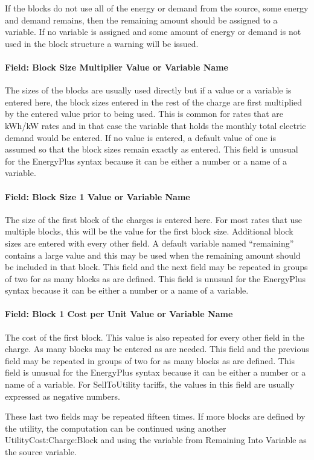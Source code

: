 If the blocks do not use all of the energy or demand from the source, some energy and demand remains, then the remaining amount should be assigned to a variable. If no variable is assigned and some amount of energy or demand is not used in the block structure a warning will be issued.

\paragraph{Field: Block Size Multiplier Value or Variable Name}\label{field-block-size-multiplier-value-or-variable-name}

The sizes of the blocks are usually used directly but if a value or a variable is entered here, the block sizes entered in the rest of the charge are first multiplied by the entered value prior to being used. This is common for rates that are kWh/kW rates and in that case the variable that holds the monthly total electric demand would be entered. If no value is entered, a default value of one is assumed so that the block sizes remain exactly as entered. This field is unusual for the EnergyPlus syntax because it can be either a number or a name of a variable.

\paragraph{Field: Block Size 1 Value or Variable Name}\label{field-block-size-1-value-or-variable-name}

The size of the first block of the charges is entered here. For most rates that use multiple blocks, this will be the value for the first block size. Additional block sizes are entered with every other field. A default variable named ``remaining'' contains a large value and this may be used when the remaining amount should be included in that block. This field and the next field may be repeated in groups of two for as many blocks as are defined. This field is unusual for the EnergyPlus syntax because it can be either a number or a name of a variable.

\paragraph{Field: Block 1 Cost per Unit Value or Variable Name}\label{field-block-1-cost-per-unit-value-or-variable-name}

The cost of the first block. This value is also repeated for every other field in the charge. As many blocks may be entered as are needed. This field and the previous field may be repeated in groups of two for as many blocks as are defined. This field is unusual for the EnergyPlus syntax because it can be either a number or a name of a variable. For SellToUtility tariffs, the values in this field are usually expressed as negative numbers.

These last two fields may be repeated fifteen times. If more blocks are defined by the utility, the computation can be continued using another UtilityCost:Charge:Block and using the variable from Remaining Into Variable as the source variable.